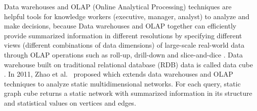 \documentclass[10pt,journal,compsoc]{IEEEtran}
\begin{document}
\IEEEdisplaynontitleabstractindextext



%
\IEEEpeerreviewmaketitle




Data warehouses and OLAP (Online Analytical Processing) techniques are helpful tools for knowledge workers (executive, manager, analyst) to analyze and make decisions, because Data warehouses and OLAP together can efficiently provide summarized information in different resolutions by specifying different views (different combinations of data dimensions) of large-scale real-world data through OLAP operations such as roll-up, drill-down and slice-and-dice \cite{chaudhuri1997overview}. Data warehouse built on traditional relational database (RDB) data is called data cube \cite{gray1997data}. In 2011, Zhao et al.\ \cite{zhao2011graph} proposed   which extends data warehouses and OLAP techniques to analyze static multidimensional networks. For each query, static graph cube returns a static network with summarized information in its structure and statistical values on vertices and edges.
\end{document}
